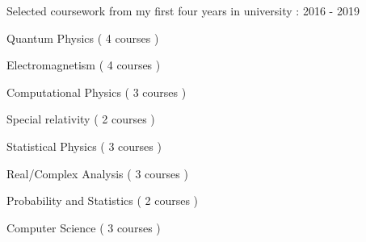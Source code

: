

\begin{cventries}

  \cventry
    {Selected coursework from my first four years in university : } %
    {} %
    {} %
    {2016 - 2019} %
    {
      \begin{cvitems} %
        \item {Quantum Physics ( 4 courses )}
        \item {Electromagnetism ( 4 courses )}
        \item {Computational Physics ( 3 courses )}
        \item {Special relativity ( 2 courses )}
        \item {Statistical Physics ( 3 courses )}
        \item {Real/Complex Analysis ( 3 courses )}
        \item {Probability and Statistics ( 2 courses )}
        \item {Computer Science ( 3 courses )}
      \end{cvitems}
    }

\end{cventries}
